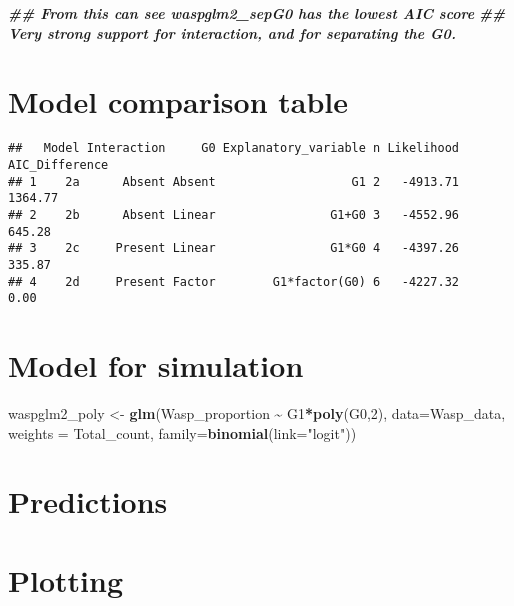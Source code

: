 \documentclass[
]{article}
\newenvironment{Shaded}{\begin{snugshade}}{\end{snugshade}}
\newcommand{\AttributeTok}[1]{\textcolor[rgb]{0.13,0.29,0.53}{#1}}
\newcommand{\DecValTok}[1]{\textcolor[rgb]{0.00,0.00,0.81}{#1}}
\newcommand{\DocumentationTok}[1]{\textcolor[rgb]{0.56,0.35,0.01}{\textbf{\textit{#1}}}}
\newcommand{\FunctionTok}[1]{\textcolor[rgb]{0.13,0.29,0.53}{\textbf{#1}}}
\newcommand{\NormalTok}[1]{#1}
\newcommand{\OtherTok}[1]{\textcolor[rgb]{0.56,0.35,0.01}{#1}}
\newcommand{\SpecialCharTok}[1]{\textcolor[rgb]{0.81,0.36,0.00}{\textbf{#1}}}
\newcommand{\StringTok}[1]{\textcolor[rgb]{0.31,0.60,0.02}{#1}}
\begin{document}
\begin{Shaded}
\begin{Highlighting}[]
\DocumentationTok{\#\# From this can see waspglm2\_sepG0 has the lowest AIC score}
\DocumentationTok{\#\# Very strong support for interaction, and for separating the G0.}
\end{Highlighting}
\end{Shaded}

\section{Model comparison table}\label{model-comparison-table}

\begin{verbatim}
##   Model Interaction     G0 Explanatory_variable n Likelihood AIC_Difference
## 1    2a      Absent Absent                   G1 2   -4913.71        1364.77
## 2    2b      Absent Linear                G1+G0 3   -4552.96         645.28
## 3    2c     Present Linear                G1*G0 4   -4397.26         335.87
## 4    2d     Present Factor        G1*factor(G0) 6   -4227.32           0.00
\end{verbatim}

\section{Model for simulation}\label{model-for-simulation}

\begin{Shaded}
\begin{Highlighting}[]
\NormalTok{waspglm2\_poly }\OtherTok{\textless{}{-}} \FunctionTok{glm}\NormalTok{(Wasp\_proportion }\SpecialCharTok{\textasciitilde{}}\NormalTok{ G1}\SpecialCharTok{*}\FunctionTok{poly}\NormalTok{(G0,}\DecValTok{2}\NormalTok{),}
                     \AttributeTok{data=}\NormalTok{Wasp\_data,}
                     \AttributeTok{weights =}\NormalTok{ Total\_count,    }
                     \AttributeTok{family=}\FunctionTok{binomial}\NormalTok{(}\AttributeTok{link=}\StringTok{"logit"}\NormalTok{))}
\end{Highlighting}
\end{Shaded}

\section{Predictions}\label{predictions}

\section{Plotting}\label{plotting}
\end{document}
